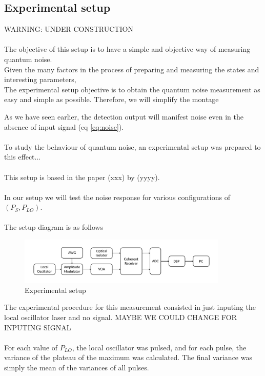 \subsection{Experimental setup}
%
WARNING: UNDER CONSTRUCTION\\
\\
The objective of this setup is to have a simple and objective way of measuring quantum noise.
\\
Given the many factors in the process of preparing and measuring the states and interesting parameters, 
\\
The experimental setup objective is to obtain the quantum noise measurement as easy and simple as possible. Therefore, we will simplify the montage

As we have seen earlier, the detection output will manifest noise even in the absence of input signal (eq \ref{eq:noise}).\\
\\
To study the behaviour of quantum noise, an experimental setup was prepared to this effect...\\
\\
This setup is based in the paper (xxx) by (yyyy).\\
\\
In our setup we will test the noise response for various configurations of  $(P_{S}, P_{LO})$.\\
\\
The setup diagram is as follows
\begin{figure}[H]
	\centering
	\includegraphics[width=10cm]{./sdf/quantum_noise/figures/scheme_experimental.pdf}
	\caption{Experimental setup}
\end{figure}
%
%
The experimental procedure for this measurement consisted in just inputing the local oscillator laser and no signal. MAYBE WE COULD CHANGE FOR INPUTING SIGNAL \\
\\
For each value of  $P_{LO}$, the local oscillator was pulsed, and for each pulse, the variance of the plateau of the maximum was calculated. The final variance was simply the mean of the variances of all pulses.

%

